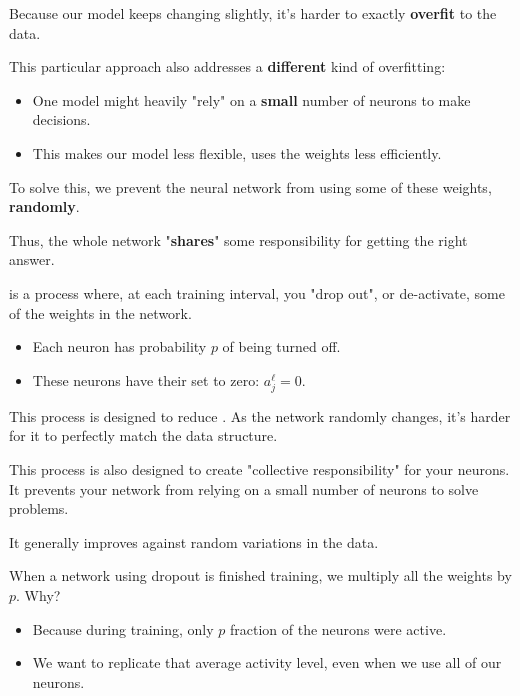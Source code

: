         Because our model keeps changing slightly, it's harder to exactly \textbf{overfit} to the data.

        \phantom{}

        This particular approach also addresses a \textbf{different} kind of overfitting:

        \begin{itemize}
            \item One model might heavily "rely" on a \textbf{small} number of neurons to make decisions.
            \item This makes our model less flexible, uses the weights less efficiently.
        \end{itemize}
        
        To solve this, we prevent the neural network from using some of these weights, \textbf{randomly}.

        Thus, the whole network "\textbf{shares}" some responsibility for  getting the right answer.\\

        \begin{definition}
             is a process where, at each training interval, you  "drop out", or de-activate, some of the weights in the network.

            \begin{itemize}
                \item Each neuron has probability $p$ of being turned off.
                \item These neurons have their  set to zero: $a^\ell_j=0$.
            \end{itemize}

            This process is designed to reduce . As the network randomly changes, it's harder for it to perfectly match the data structure.

            This process is also designed to create "collective responsibility" for your neurons. It prevents your network from relying on a small number of neurons to solve problems.

            It generally improves  against random variations in the data.
        \end{definition}

        \phantom{}

        \begin{clarification}
            When a network using dropout is finished training, we multiply all the weights by $p$. Why?

            \begin{itemize}
                \item Because during training, only $p$ fraction of the neurons were active. 
                \item We want to replicate that average activity level, even when we use all of our neurons.
            \end{itemize}
        \end{clarification}

